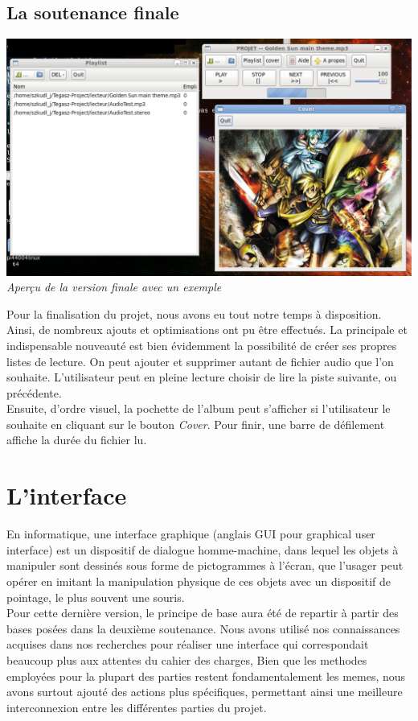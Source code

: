 \documentclass[12pt,a4paper]{report}
\begin{document}
\section{La soutenance finale}

\begin{center}
\includegraphics[scale = 0.4]{interface3.png}
\it{Aperçu de la version finale avec un exemple}
\end{center}

Pour la finalisation du projet, nous avons eu tout notre temps à disposition. Ainsi, de nombreux ajouts et optimisations ont pu être effectués.
La principale et indispensable nouveauté est bien évidemment la possibilité de créer ses propres listes de lecture. On peut ajouter et supprimer autant de fichier audio que l'on souhaite. L'utilisateur peut en pleine lecture choisir de lire la piste suivante, ou précédente.\\
Ensuite, d'ordre visuel, la pochette de l'album peut s'afficher si l'utilisateur le souhaite en cliquant sur le bouton \emph{Cover}. Pour finir, une barre de défilement affiche la durée du fichier lu.

\chapter{L'interface}

En informatique, une interface graphique (anglais GUI pour graphical user interface) est un dispositif de dialogue homme-machine, dans lequel les objets à manipuler sont dessinés sous forme de pictogrammes à l'écran, que l'usager peut opérer en imitant la manipulation physique de ces objets avec un dispositif de pointage, le plus souvent une souris.\\

Pour cette dernière version, le principe de base aura été de repartir à
partir des bases posées dans la deuxième soutenance. Nous avons utilisé nos connaissances acquises dans nos recherches pour réaliser une interface qui correspondait beaucoup plus aux attentes du cahier des charges, Bien que les methodes employées pour la plupart des parties restent fondamentalement les memes, nous avons surtout ajouté des actions plus spécifiques, permettant ainsi une meilleure interconnexion entre les différentes parties du projet.
\end{document}
